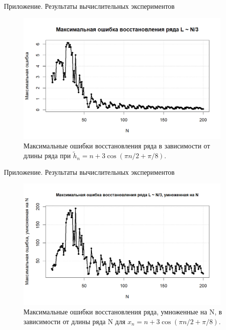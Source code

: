 \documentclass[notheorems, handout]{beamer}
\begin{document}
	\begin{frame}{Приложение. Результаты вычислительных экспериментов}
		\begin{figure}[!h]
			\includegraphics[width=0.95\textwidth]{Pictures/MERNoN.png}
			\caption{Максимальные ошибки восстановления ряда в зависимости от длины ряда при $\widetilde{h}_n = n + 3\cos(\pi n/2 + \pi/8)$.}\label{pic:1}
		\end{figure}
	\end{frame}
	\begin{frame}{Приложение. Результаты вычислительных экспериментов}
		\begin{figure}[!h]
			\includegraphics[width=0.95\textwidth]{Pictures/MERN.png}
			\caption{Максимальные ошибки восстановления ряда, умноженные на N, в зависимости от длины ряда N для $x_n = n + 3\cos(\pi n/2 + \pi/8)$.}\label{pic:2}
		\end{figure}
	\end{frame}
	
\end{document}
